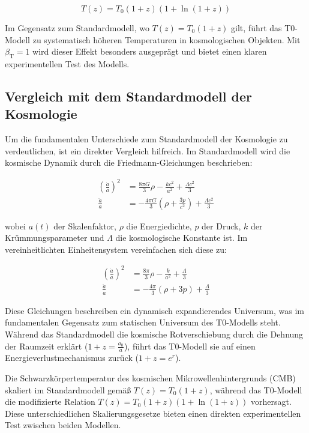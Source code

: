 \documentclass[12pt,a4paper]{article}
\newcommand{\betaT}{\beta_{\text{T}}}
\begin{document}
	\begin{equation}
		T(z) = T_0 (1+z)(1 + \ln(1+z))
	\end{equation}
	
	Im Gegensatz zum Standardmodell, wo \(T(z) = T_0 (1+z)\) gilt, führt das T0-Modell zu systematisch höheren Temperaturen in kosmologischen Objekten. Mit \(\betaT = 1\) wird dieser Effekt besonders ausgeprägt und bietet einen klaren experimentellen Test des Modells.
	
	\subsection{Vergleich mit dem Standardmodell der Kosmologie}
	Um die fundamentalen Unterschiede zum Standardmodell der Kosmologie zu verdeutlichen, ist ein direkter Vergleich hilfreich. Im Standardmodell wird die kosmische Dynamik durch die Friedmann-Gleichungen beschrieben:
	
	\begin{align}
		\left(\frac{\dot{a}}{a}\right)^2 &= \frac{8\pi G}{3}\rho - \frac{kc^2}{a^2} + \frac{\Lambda c^2}{3} \\
		\frac{\ddot{a}}{a} &= -\frac{4\pi G}{3}\left(\rho + \frac{3p}{c^2}\right) + \frac{\Lambda c^2}{3}
	\end{align}
	
	wobei \(a(t)\) der Skalenfaktor, \(\rho\) die Energiedichte, \(p\) der Druck, \(k\) der Krümmungsparameter und \(\Lambda\) die kosmologische Konstante ist. Im vereinheitlichten Einheitensystem vereinfachen sich diese zu:
	
	\begin{align}
		\left(\frac{\dot{a}}{a}\right)^2 &= \frac{8\pi}{3}\rho - \frac{k}{a^2} + \frac{\Lambda}{3} \\
		\frac{\ddot{a}}{a} &= -\frac{4\pi}{3}(\rho + 3p) + \frac{\Lambda}{3}
	\end{align}
	
	Diese Gleichungen beschreiben ein dynamisch expandierendes Universum, was im fundamentalen Gegensatz zum statischen Universum des T0-Modells steht. Während das Standardmodell die kosmische Rotverschiebung durch die Dehnung der Raumzeit erklärt (\(1+z = \frac{a_0}{a}\)), führt das T0-Modell sie auf einen Energieverlustmechanismus zurück (\(1+z = e^r\)).
	
	Die Schwarzkörpertemperatur des kosmischen Mikrowellenhintergrunds (CMB) skaliert im Standardmodell gemäß \(T(z) = T_0(1+z)\), während das T0-Modell die modifizierte Relation \(T(z) = T_0(1+z)(1+\ln(1+z))\) vorhersagt. Diese unterschiedlichen Skalierungsgesetze bieten einen direkten experimentellen Test zwischen beiden Modellen.
	
\end{document}
